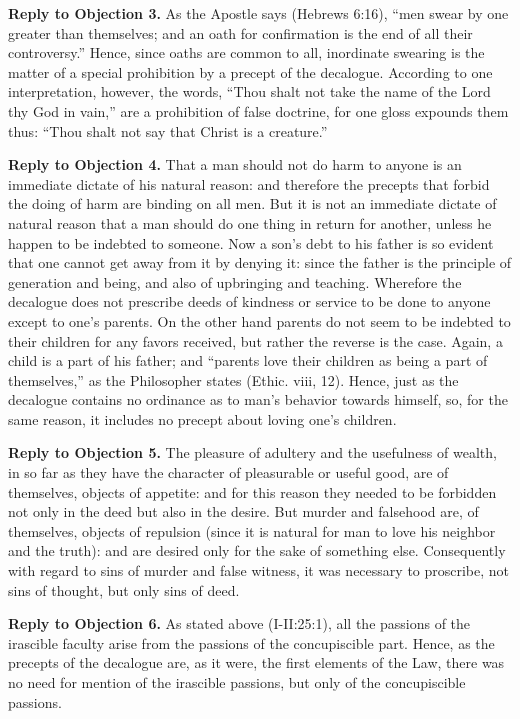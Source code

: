 \textbf{Reply to Objection 3.} As the Apostle says (Hebrews 6:16), ``men swear by one greater than themselves; and an oath for confirmation is the end of all their controversy.'' Hence, since oaths are common to all, inordinate swearing is the matter of a special prohibition by a precept of the decalogue. According to one interpretation, however, the words, ``Thou shalt not take the name of the Lord thy God in vain,'' are a prohibition of false doctrine, for one gloss expounds them thus: ``Thou shalt not say that Christ is a creature.''

\textbf{Reply to Objection 4.} That a man should not do harm to anyone is an immediate dictate of his natural reason: and therefore the precepts that forbid the doing of harm are binding on all men. But it is not an immediate dictate of natural reason that a man should do one thing in return for another, unless he happen to be indebted to someone. Now a son's debt to his father is so evident that one cannot get away from it by denying it: since the father is the principle of generation and being, and also of upbringing and teaching. Wherefore the decalogue does not prescribe deeds of kindness or service to be done to anyone except to one's parents. On the other hand parents do not seem to be indebted to their children for any favors received, but rather the reverse is the case. Again, a child is a part of his father; and ``parents love their children as being a part of themselves,'' as the Philosopher states (Ethic. viii, 12). Hence, just as the decalogue contains no ordinance as to man's behavior towards himself, so, for the same reason, it includes no precept about loving one's children.

\textbf{Reply to Objection 5.} The pleasure of adultery and the usefulness of wealth, in so far as they have the character of pleasurable or useful good, are of themselves, objects of appetite: and for this reason they needed to be forbidden not only in the deed but also in the desire. But murder and falsehood are, of themselves, objects of repulsion (since it is natural for man to love his neighbor and the truth): and are desired only for the sake of something else. Consequently with regard to sins of murder and false witness, it was necessary to proscribe, not sins of thought, but only sins of deed.

\textbf{Reply to Objection 6.} As stated above (I-II:25:1), all the passions of the irascible faculty arise from the passions of the concupiscible part. Hence, as the precepts of the decalogue are, as it were, the first elements of the Law, there was no need for mention of the irascible passions, but only of the concupiscible passions.

